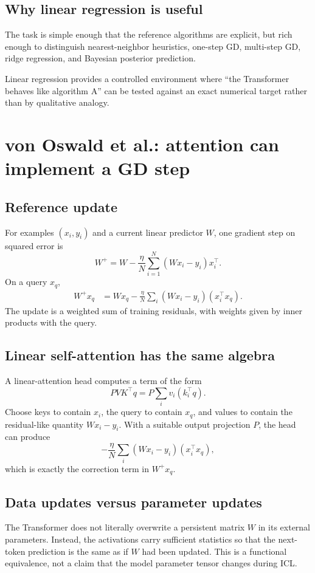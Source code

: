 \documentclass[11pt,a4paper,oneside,openany]{memoir}
\theoremstyle{definition}
\begin{document}
\section{Why linear regression is useful}
The task is simple enough that the reference algorithms are explicit, but rich enough to distinguish nearest-neighbor heuristics, one-step GD, multi-step GD, ridge regression, and Bayesian posterior prediction.

\begin{presentbox}
Linear regression provides a controlled environment where ``the Transformer behaves like algorithm A'' can be tested against an exact numerical target rather than by qualitative analogy.
\end{presentbox}

\chapter{von Oswald et al.: attention can implement a GD step}
\section{Reference update}
For examples $(x_i,y_i)$ and a current linear predictor $W$, one gradient step on squared error is
\[
W^+=W-\frac\eta N\sum_{i=1}^N(Wx_i-y_i)x_i^\top.
\]
On a query $x_q$,
\begin{align*}
W^+x_q
&=Wx_q-\frac\eta N\sum_i(Wx_i-y_i)(x_i^\top x_q).
\end{align*}
The update is a weighted sum of training residuals, with weights given by inner products with the query.

\section{Linear self-attention has the same algebra}
A linear-attention head computes a term of the form
\[
PVK^\top q=P\sum_i v_i(k_i^\top q).
\]
Choose keys to contain $x_i$, the query to contain $x_q$, and values to contain the residual-like quantity $Wx_i-y_i$.  With a suitable output projection $P$, the head can produce
\[
-\frac\eta N\sum_i(Wx_i-y_i)(x_i^\top x_q),
\]
which is exactly the correction term in $W^+x_q$.

\section{Data updates versus parameter updates}
The Transformer does not literally overwrite a persistent matrix $W$ in its external parameters.  Instead, the activations carry sufficient statistics so that the next-token prediction is the same as if $W$ had been updated.  This is a functional equivalence, not a claim that the model parameter tensor changes during ICL.
\end{document}

